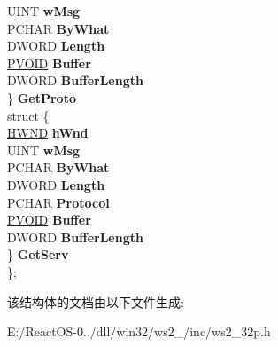 \begin{DoxyCompactItemize}
\begin{tabbing}
\>\>UINT {\bfseries wMsg}\\
\>\>PCHAR {\bfseries ByWhat}\\
\>\>DWORD {\bfseries Length}\\
\>\>\hyperlink{interfacevoid}{PVOID} {\bfseries Buffer}\\
\>\>DWORD {\bfseries BufferLength}\\
\>\} {\bfseries GetProto}\\
\>struct \{\\
\>\>\hyperlink{interfacevoid}{HWND} {\bfseries hWnd}\\
\>\>UINT {\bfseries wMsg}\\
\>\>PCHAR {\bfseries ByWhat}\\
\>\>DWORD {\bfseries Length}\\
\>\>PCHAR {\bfseries Protocol}\\
\>\>\hyperlink{interfacevoid}{PVOID} {\bfseries Buffer}\\
\>\>DWORD {\bfseries BufferLength}\\
\>\} {\bfseries GetServ}\\
\}; \\

\end{tabbing}\end{DoxyCompactItemize}


该结构体的文档由以下文件生成\+:\begin{DoxyCompactItemize}
\item 
E\+:/\+React\+O\+S-\/0../dll/win32/ws2\+\_/inc/ws2\+\_\+32p.\+h\end{DoxyCompactItemize}

